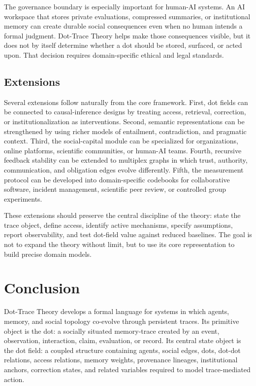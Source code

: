 \documentclass[11pt]{article}
\theoremstyle{remark}
\begin{document}
The governance boundary is especially important for human-AI systems. An AI workspace that stores private evaluations, compressed summaries, or institutional memory can create durable social consequences even when no human intends a formal judgment. Dot-Trace Theory helps make those consequences visible, but it does not by itself determine whether a dot should be stored, surfaced, or acted upon. That decision requires domain-specific ethical and legal standards.

\subsection{Extensions}\label{boundary-extensions}

Several extensions follow naturally from the core framework. First, dot fields can be connected to causal-inference designs by treating access, retrieval, correction, or institutionalization as interventions. Second, semantic representations can be strengthened by using richer models of entailment, contradiction, and pragmatic context. Third, the social-capital module can be specialized for organizations, online platforms, scientific communities, or human-AI teams. Fourth, recursive feedback stability can be extended to multiplex graphs in which trust, authority, communication, and obligation edges evolve differently. Fifth, the measurement protocol can be developed into domain-specific codebooks for collaborative software, incident management, scientific peer review, or controlled group experiments.

These extensions should preserve the central discipline of the theory: state the trace object, define access, identify active mechanisms, specify assumptions, report observability, and test dot-field value against reduced baselines. The goal is not to expand the theory without limit, but to use its core representation to build precise domain models.

\section{Conclusion}\label{conclusion}

Dot-Trace Theory develops a formal language for systems in which agents, memory, and social topology co-evolve through persistent traces. Its primitive object is the dot: a socially situated memory-trace created by an event, observation, interaction, claim, evaluation, or record. Its central state object is the dot field: a coupled structure containing agents, social edges, dots, dot-dot relations, access relations, memory weights, provenance lineages, institutional anchors, correction states, and related variables required to model trace-mediated action.
\end{document}
